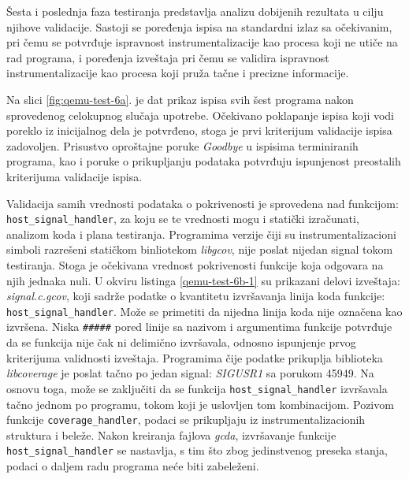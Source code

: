 \documentclass[12pt,oneside]{memoir}
\newcommand{\kod}[1]{\texttt{#1}}
\newcommand{\strano}[1]{\textit{#1}}
\begin{document}
Šesta i poslednja faza testiranja predstavlja analizu dobijenih rezultata u cilju njihove validacije. Sastoji se poređenja ispisa na standardni izlaz sa očekivanim, pri čemu se potvrđuje ispravnost instrumentalizacije kao procesa koji ne utiče na rad programa, i  poređenja izveštaja pri čemu se validira ispravnost instrumentalizacije kao procesa koji pruža tačne i precizne informacije. 

Na slici \ref{fig:qemu-test-6a}. je dat prikaz ispisa svih šest programa nakon sprovedenog celokupnog slučaja upotrebe. Očekivano poklapanje ispisa koji vodi poreklo iz inicijalnog dela je potvrđeno, stoga je prvi kriterijum validacije ispisa zadovoljen. Prisustvo oproštajne poruke \strano{Goodbye} u ispisima terminiranih programa, kao i poruke o prikupljanju podataka
potvrđuju ispunjenost preostalih kriterijuma validacije ispisa.

Validacija samih vrednosti podataka o pokrivenosti je sprovedena nad funkcijom: \kod{host\_signal\_handler}, za koju se te vrednosti mogu i statički izračunati, analizom koda i plana testiranja. Programima verzije čiji su instrumentalizacioni simboli razrešeni statičkom binliotekom \strano{libgcov}, nije poslat nijedan signal tokom testiranja. Stoga je očekivana vrednost pokrivenosti funkcije koja odgovara na njih jednaka nuli. U okviru listinga \ref{qemu-test-6b-1} su prikazani delovi izveštaja: \strano{signal.c.gcov}, koji sadrže podatke o kvantitetu izvršavanja linija koda funkcije: \kod{host\_signal\_handler}. Može se primetiti da nijedna linija koda nije označena kao izvršena. Niska \kod{\#\#\#\#\#} pored linije sa nazivom i argumentima funkcije potvrđuje da se funkcija nije čak ni delimično izvršavala, odnosno ispunjenje prvog kriterijuma validnosti izveštaja. Programima čije podatke prikuplja biblioteka \strano{libcoverage} je poslat tačno po jedan signal: \strano{SIGUSR1} sa porukom 45949. Na osnovu toga, može se zaključiti da se funkcija \kod{host\_signal\_handler} izvršavala tačno jednom po programu, tokom koji je uslovljen tom kombinacijom. Pozivom funkcije \kod{coverage\_handler}, podaci se prikupljaju iz instrumentalizacionih struktura i beleže. Nakon kreiranja fajlova \strano{gcda}, izvršavanje funkcije \kod{host\_signal\_handler} se nastavlja, s tim što zbog jedinstvenog preseka stanja, podaci o daljem radu programa neće biti zabeleženi. 
\end{document}
